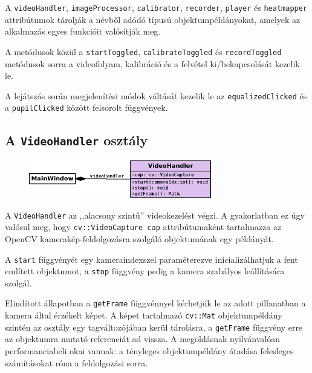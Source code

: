 A \texttt{videoHandler}, \texttt{imageProcessor}, \texttt{calibrator}, \texttt{recorder}, \texttt{player} és \texttt{heatmapper} attribútumok tárolják a névből adódó típusú objektumpéldányokat, amelyek az alkalmazás egyes funkcióit valósítják meg.

A metódusok közül a \texttt{startToggled}, \texttt{calibrateToggled} és \texttt{recordToggled} metódusok sorra a videofolyam, kalibráció és a felvétel ki/bekapcsolását kezelik le.

A lejátszás során megjelenítési módok váltását kezelik le az \texttt{equalizedClicked} és a \texttt{pupilClicked} között felsorolt függvények.

\subsection{A \texttt{VideoHandler} osztály}\label{sect:videohandler}

\begin{figure}[!ht]
\centering
\includegraphics[width=80mm, keepaspectratio]{figures/class_videohandler.png}
\end{figure}

A \texttt{VideoHandler} az ,,alacsony szintű'' videokezelést végzi. A gyakorlatban ez úgy valósul meg, hogy \texttt{cv::VideoCapture cap} attribútumaként tartalmazza az OpenCV kamerakép-feldolgozásra szolgáló objektumának egy példányát.

A \texttt{start} függvényét egy kameraindexszel paraméterezve inicializálhatjuk a fent említett objektumot, a \texttt{stop} függvény pedig a kamera szabályos leállítására szolgál.

Elindított állapotban a \texttt{getFrame} függvénnyel kérhetjük le az adott pillanatban a kamera által érzékelt képet. A képet tartalmazó \texttt{cv::Mat} objektumpéldány szintén az osztály egy tagváltozójában kerül tárolásra, a \texttt{getFrame} függvény erre az objektumra mutató referenciát ad vissza. A megoldásnak nyilvánvalóan performanciabeli okai vannak: a tényleges objektumpéldány átadása felesleges számításokat róna a feldolgozási sorra.

